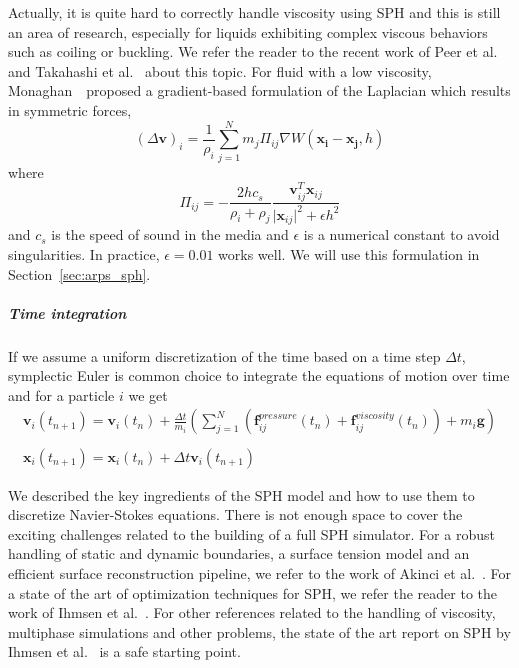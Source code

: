 Actually, it is quite hard to correctly handle viscosity using SPH and this is still an area of research, especially for liquids exhibiting complex viscous behaviors such as coiling or buckling.
We refer the reader to the recent work of Peer et al.~\cite{Peer2015} and Takahashi et al.~\cite{Takahashi2015} about this topic.
For fluid with a low viscosity, Monaghan~\cite{Monaghan2005}~proposed a gradient-based formulation of the Laplacian which results in symmetric forces,
\begin{equation}
\label{eq:velocityLaplacianSPH}
\left(\Delta \mathbf{v}\right)_{i} = 
\frac{1}{\rho_{i}}
\sum_{j=1}^{N} m_{j} \Pi_{ij} \nabla W(\mathbf{x_{i}}-\mathbf{x_{j}},h)
\end{equation}
where 
\begin{equation}
    \Pi_{ij} = -\frac{2hc_{s}}{\rho_{i}+\rho_{j}}\frac{\mathbf{v}_{ij}^{T}\mathbf{x}_{ij}}{\vert \mathbf{x}_{ij} \vert^{2} + \epsilon h^{2}}
\end{equation}
and $c_{s}$ is the speed of sound in the media and $\epsilon$ is a numerical constant to avoid singularities.
In practice, $\epsilon=0.01$ works well. We will use this formulation in Section~\ref{sec:arps_sph}.
\subparagraph{Time integration} If we assume a uniform discretization of the time based on a time step $\Delta t$, symplectic Euler is common choice to integrate the equations of motion over time and for a particle $i$ we get
\begin{equation}
\begin{array}{ll}
\displaystyle \mathbf{v}_{i}(t_{n+1}) = \mathbf{v}_{i}(t_{n}) + \frac{\Delta t}{m_{i}}\left( \sum_{j=1}^{N}\left(\mathbf{f}_{ij}^{pressure}(t_{n})+\mathbf{f}_{ij}^{viscosity}(t_{n})\right)+m_{i}\mathbf{g}\right) \\ \\
\displaystyle \mathbf{x}_{i}(t_{n+1}) = \mathbf{x}_{i}(t_{n}) + \Delta t \mathbf{v}_{i}(t_{n+1})
\end{array}
\end{equation}

We described the key ingredients of the SPH model and how to use them to discretize Navier-Stokes equations. 
There is not enough space to cover the exciting challenges related to the building of a full SPH simulator. 
For a robust handling of static and dynamic boundaries, a surface tension model and an efficient surface reconstruction pipeline, we refer to the work of Akinci et al.~\cite{Akinci2012b, Akinci2013, Akinci2012a}.  
For a state of the art of optimization techniques for SPH, we refer the reader to the work of Ihmsen et al.~\cite{Ihmsen2011:ParallelSPH}. 
For other references related to the handling of viscosity, multiphase simulations and other problems, the state of the art report on SPH by Ihmsen et al.~\cite{Ihmsen2014:STAR} is a safe starting point.

